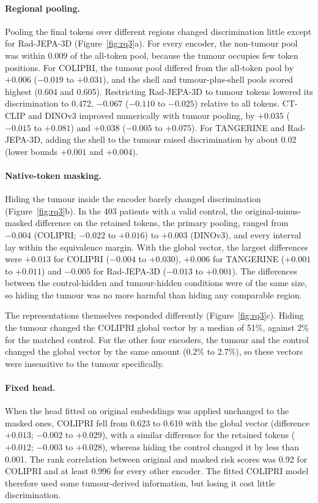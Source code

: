 \paragraph{Regional pooling.} Pooling the final tokens over different regions changed discrimination little except for Rad-JEPA-3D (Figure~\ref{fig:rq3}a). For every encoder, the non-tumour pool was within 0.009 of the all-token pool, because the tumour occupies few token positions. For COLIPRI, the tumour pool differed from the all-token pool by $+0.006$ ($-0.019$ to $+0.031$), and the shell and tumour-plus-shell pools scored highest (0.604 and 0.605). Restricting Rad-JEPA-3D to tumour tokens lowered its discrimination to 0.472, $-0.067$ ($-0.110$ to $-0.025$) relative to all tokens. CT-CLIP and DINOv3 improved numerically with tumour pooling, by $+0.035$ ($-0.015$ to $+0.081$) and $+0.038$ ($-0.005$ to $+0.075$). For TANGERINE and Rad-JEPA-3D, adding the shell to the tumour raised discrimination by about 0.02 (lower bounds $+0.001$ and $+0.004$).

\paragraph{Native-token masking.} Hiding the tumour inside the encoder barely changed discrimination (Figure~\ref{fig:rq3}b). In the 403 patients with a valid control, the original-minus-masked difference on the retained tokens, the primary pooling, ranged from $-0.004$ (COLIPRI; $-0.022$ to $+0.016$) to $+0.003$ (DINOv3), and every interval lay within the equivalence margin. With the global vector, the largest differences were $+0.013$ for COLIPRI ($-0.004$ to $+0.030$), $+0.006$ for TANGERINE ($+0.001$ to $+0.011$) and $-0.005$ for Rad-JEPA-3D ($-0.013$ to $+0.001$). The differences between the control-hidden and tumour-hidden conditions were of the same size, so hiding the tumour was no more harmful than hiding any comparable region.

The representations themselves responded differently (Figure~\ref{fig:rq3}c). Hiding the tumour changed the COLIPRI global vector by a median of 51\%, against 2\% for the matched control. For the other four encoders, the tumour and the control changed the global vector by the same amount (0.2\% to 2.7\%), so these vectors were insensitive to the tumour specifically.

\paragraph{Fixed head.} When the head fitted on original embeddings was applied unchanged to the masked ones, COLIPRI fell from 0.623 to 0.610 with the global vector (difference $+0.013$; $-0.002$ to $+0.029$), with a similar difference for the retained tokens ($+0.012$; $-0.003$ to $+0.028$), whereas hiding the control changed it by less than 0.001. The rank correlation between original and masked risk scores was 0.92 for COLIPRI and at least 0.996 for every other encoder. The fitted COLIPRI model therefore used some tumour-derived information, but losing it cost little discrimination.

